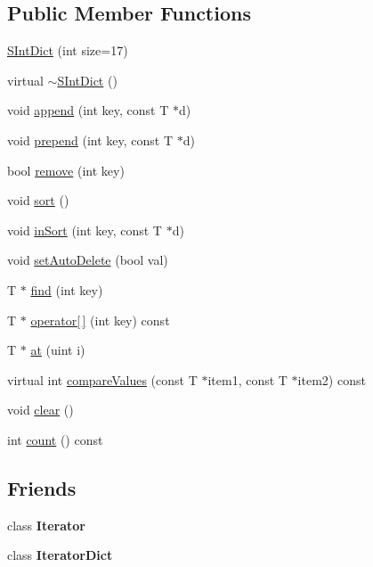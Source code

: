 \subsection*{Public Member Functions}
\begin{DoxyCompactItemize}
\item 
\mbox{\hyperlink{class_s_int_dict_a3285b0a5debceb2190c4f1cc8f8fd78b}{S\+Int\+Dict}} (int size=17)
\item 
virtual \mbox{\hyperlink{class_s_int_dict_a8d2e7da0367e653b432447a9dce7c604}{$\sim$\+S\+Int\+Dict}} ()
\item 
void \mbox{\hyperlink{class_s_int_dict_a829c9e4c9827e765145d150ffb18b1ae}{append}} (int key, const T $\ast$d)
\item 
void \mbox{\hyperlink{class_s_int_dict_a394582f93d6d758a477e86f84087c6a6}{prepend}} (int key, const T $\ast$d)
\item 
bool \mbox{\hyperlink{class_s_int_dict_a3e7bf8861e4650f5f958000b86b2312a}{remove}} (int key)
\item 
void \mbox{\hyperlink{class_s_int_dict_ae205d1b7f76cea9da3f117e830bd7dfa}{sort}} ()
\item 
void \mbox{\hyperlink{class_s_int_dict_a16cc84888ede2d895d4df0323608862d}{in\+Sort}} (int key, const T $\ast$d)
\item 
void \mbox{\hyperlink{class_s_int_dict_aa847c843b8f2509d2021d8db470aa14f}{set\+Auto\+Delete}} (bool val)
\item 
T $\ast$ \mbox{\hyperlink{class_s_int_dict_a5b08deebe24072f66bdce4fed2a3863d}{find}} (int key)
\item 
T $\ast$ \mbox{\hyperlink{class_s_int_dict_aca2cf7030f2e469f1d7dfe8eaaa178f7}{operator\mbox{[}$\,$\mbox{]}}} (int key) const
\item 
T $\ast$ \mbox{\hyperlink{class_s_int_dict_a13bbde7f8fdac65c32e670d627fbdeac}{at}} (uint i)
\item 
virtual int \mbox{\hyperlink{class_s_int_dict_a9c43e81469aa5e458aa7eb82f4217d10}{compare\+Values}} (const T $\ast$item1, const T $\ast$item2) const
\item 
void \mbox{\hyperlink{class_s_int_dict_ab86a29e18447f3f5347bb29478a2e8f4}{clear}} ()
\item 
int \mbox{\hyperlink{class_s_int_dict_aed64f84f475ba2ebec343935f8e7bc6c}{count}} () const
\end{DoxyCompactItemize}
\subsection*{Friends}
\begin{DoxyCompactItemize}
\item 
\mbox{\label{class_s_int_dict_a9830fc407400559db7e7783cc10a9394}} 
class {\bfseries Iterator}
\item 
\mbox{\label{class_s_int_dict_ab362b5ead75b40c212098db068d50ac7}} 
class {\bfseries Iterator\+Dict}
\end{DoxyCompactItemize}


